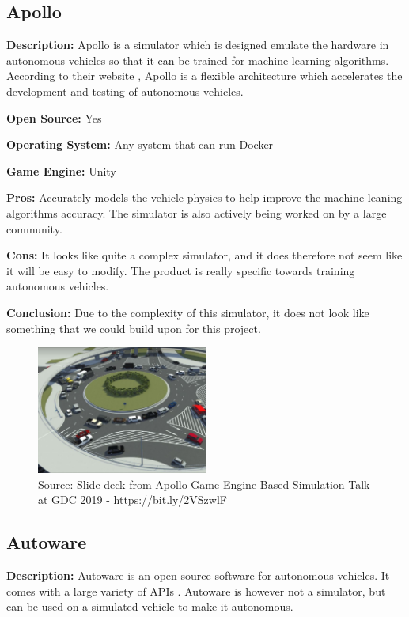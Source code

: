 \subsection{Apollo}
\textbf{Description:} Apollo is a simulator which is designed emulate the hardware in autonomous vehicles so that it can be trained for machine learning algorithms. According to their website \cite{Apollo_Website}, Apollo is a flexible architecture which accelerates the development and testing of autonomous vehicles.

\textbf{Open Source:} Yes

\textbf{Operating System:} Any system that can run Docker

\textbf{Game Engine:} Unity

\textbf{Pros:} Accurately models the vehicle physics to help improve the machine leaning algorithms accuracy. The simulator is also actively being worked on by a large community.  

\textbf{Cons:} It looks like quite a complex simulator, and it does therefore not seem like it will be easy to modify. The product is really specific towards training autonomous vehicles. 

\textbf{Conclusion:} Due to the complexity of this simulator, it does not look like something that we could build upon for this project. 

\begin{figure}[H]
    \centering
    \includegraphics[width=0.5\textwidth]{Simulators/Apollo.JPG}
    \caption{Source: Slide deck from Apollo Game Engine Based Simulation Talk at GDC 2019 - \url{https://bit.ly/2VSzwlF}}
\end{figure}

\subsection{Autoware}
\textbf{Description:} Autoware is an open-source software for autonomous vehicles. It comes with a large variety of APIs  \cite{Autoware_doc_Website}. Autoware is however not a simulator, but can be used on a simulated vehicle to make it autonomous.

